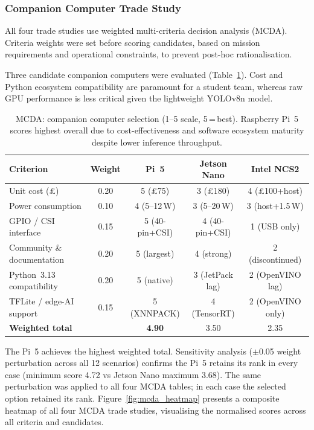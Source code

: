 \subsubsection{Companion Computer Trade Study}

All four trade studies use weighted multi-criteria decision analysis (MCDA). Criteria weights were set before scoring candidates, based on mission requirements and operational constraints, to prevent post-hoc rationalisation.

Three candidate companion computers were evaluated (Table~\ref{tab:mcda-companion}). Cost and Python ecosystem compatibility are paramount for a student team, whereas raw GPU performance is less critical given the lightweight YOLOv8n model.

\begin{table}[H]
  \centering\compactTable
  \caption{MCDA: companion computer selection (1--5 scale, 5\,=\,best).  Raspberry Pi~5 scores highest overall due to cost-effectiveness and software ecosystem maturity despite lower inference throughput.}
  \label{tab:mcda-companion}
  \begin{tabularx}{\textwidth}{X c c c c}
    \toprule
    \textbf{Criterion} & \textbf{Weight} & \textbf{Pi~5} & \textbf{Jetson Nano} & \textbf{Intel NCS2} \\
    \midrule
    Unit cost (\pounds)          & 0.20 & 5 (\pounds75)  & 3 (\pounds180) & 4 (\pounds100+host) \\
    Power consumption            & 0.10 & 4 (5--12\,W)   & 3 (5--20\,W)   & 3 (host+1.5\,W) \\
    GPIO / CSI interface         & 0.15 & 5 (40-pin+CSI) & 4 (40-pin+CSI) & 1 (USB only) \\
    Community \& documentation   & 0.20 & 5 (largest)    & 4 (strong)     & 2 (discontinued) \\
    Python~3.13 compatibility    & 0.20 & 5 (native)     & 3 (JetPack lag) & 2 (OpenVINO lag) \\
    TFLite / edge-AI support     & 0.15 & 5 (XNNPACK)   & 4 (TensorRT)   & 2 (OpenVINO only) \\
    \midrule
    \textbf{Weighted total}      &      & \textbf{4.90}  & 3.50           & 2.35 \\
    \bottomrule
  \end{tabularx}
\end{table}

\noindent The Pi~5 achieves the highest weighted total. Sensitivity analysis ($\pm$0.05 weight perturbation across all 12 scenarios) confirms the Pi~5 retains its rank in every case (minimum score 4.72 vs Jetson Nano maximum 3.68). The same perturbation was applied to all four MCDA tables; in each case the selected option retained its rank. Figure~\ref{fig:mcda_heatmap} presents a composite heatmap of all four MCDA trade studies, visualising the normalised scores across all criteria and candidates.

